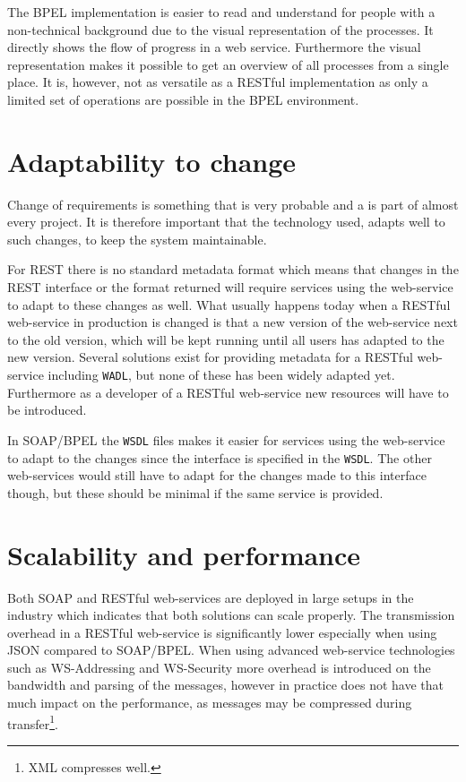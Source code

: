 The BPEL implementation is easier to read and understand for people with a non-technical background due to the visual representation of the processes. It directly shows the flow of progress in a web service. Furthermore the visual representation makes it possible to get an overview of all processes from a single place. It is, however, not as versatile as a RESTful implementation as only a limited set of operations are possible in the BPEL environment.

\section{Adaptability to change}
\pet

\noindent
Change of requirements is something that is very probable and a is part of almost every project. It is therefore important that the technology used, adapts well to such changes, to keep the system maintainable.

For REST there is no standard metadata format which means that changes in the REST interface or the format returned will require services using the web-service to adapt to these changes as well. What usually happens today when a RESTful web-service in production is changed is that a new version of the web-service next to the old version, which will be kept running until all users has adapted to the new version. Several solutions exist for providing metadata for a RESTful web-service including \texttt{WADL}, but none of these has been widely adapted yet. Furthermore as a developer of a RESTful web-service new resources will have to be introduced.

In SOAP/BPEL the \texttt{WSDL} files makes it easier for services using the web-service to adapt to the changes since the interface is specified in the \texttt{WSDL}. The other web-services would still have to adapt for the changes made to this interface though, but these should be minimal if the same service is provided.

\section{Scalability and performance}
\kim

\noindent
Both SOAP and RESTful web-services are deployed in large setups in the industry which indicates that both solutions can scale properly. The transmission overhead in a RESTful web-service is significantly lower especially when using JSON compared to SOAP/BPEL. When using advanced web-service technologies such as WS-Addressing and WS-Security more overhead is introduced on the bandwidth and parsing of the messages, however in practice does not have that much impact on the performance, as messages may be compressed during transfer\footnote{XML compresses well.}.


